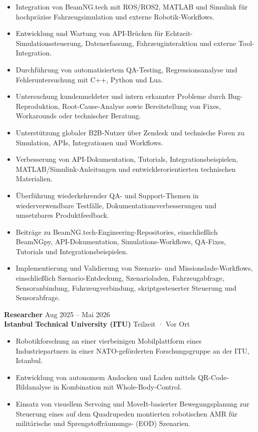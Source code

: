 \documentclass[11pt,a4paper]{article}
\begin{document}
\begin{itemize}
    \item Integration von BeamNG.tech mit ROS/ROS2, MATLAB und Simulink für hochpräzise Fahrzeugsimulation und externe Robotik-Workflows.
    \item Entwicklung und Wartung von API-Brücken für Echtzeit-Simulationssteuerung, Datenerfassung, Fahrzeuginteraktion und externe Tool-Integration.
    \item Durchführung von automatisiertem QA-Testing, Regressionsanalyse und Fehleruntersuchung mit C++, Python und Lua.
    \item Untersuchung kundenmeldeter und intern erkannter Probleme durch Bug-Reproduktion, Root-Cause-Analyse sowie Bereitstellung von Fixes, Workarounds oder technischer Beratung.
    \item Unterstützung globaler B2B-Nutzer über Zendesk und technische Foren zu Simulation, APIs, Integrationen und Workflows.
    \item Verbesserung von API-Dokumentation, Tutorials, Integrationsbeispielen, MATLAB/Simulink-Anleitungen und entwicklerorientierten technischen Materialien.
    \item Überführung wiederkehrender QA- und Support-Themen in wiederverwendbare Testfälle, Dokumentationsverbesserungen und umsetzbares Produktfeedback.
    \item Beiträge zu BeamNG.tech-Engineering-Repositories, einschließlich BeamNGpy, API-Dokumentation, Simulations-Workflows, QA-Fixes, Tutorials und Integrationsbeispielen.
    \item Implementierung und Validierung von Szenario- und Missionslade-Workflows, einschließlich Szenario-Entdeckung, Szenarioladen, Fahrzeugabfrage, Sensoranbindung, Fahrzeugverbindung, skriptgesteuerter Steuerung und Sensorabfrage.
\end{itemize}

\textbf{\color{PrimaryColor}Researcher} \hfill Aug 2025 -- Mai 2026\\
\textbf{Istanbul Technical University (ITU)} \hfill Teilzeit · Vor Ort

\begin{itemize}
    \item Robotikforschung an einer vierbeinigen Mobilplattform eines Industriepartners in einer NATO-geförderten Forschungsgruppe an der ITU, Istanbul.
    \item Entwicklung von autonomem Andocken und Laden mittels QR-Code-Bildanalyse in Kombination mit Whole-Body-Control.
    \item Einsatz von visuellem Servoing und MoveIt-basierter Bewegungsplanung zur Steuerung eines auf dem Quadrupeden montierten robotischen AMR für militärische und Sprengstoffräumungs- (EOD) Szenarien.
\end{itemize}
\end{document}
